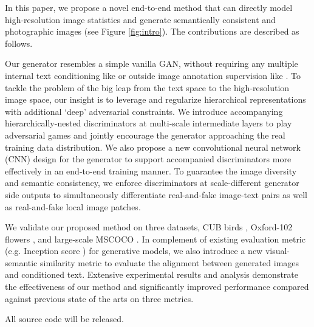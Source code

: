 \documentclass[10pt,twocolumn,letterpaper]{article}
\begin{document}
In this paper, we propose a novel end-to-end method that can directly model high-resolution image statistics and generate semantically consistent and photographic images (see Figure \ref{fig:intro}). The contributions are described as follows.

Our generator resembles a simple vanilla GAN, without requiring any multiple internal text conditioning like \cite{han2017stackgan} or outside image annotation supervision like \cite{dash2017tac}. To tackle the problem of the big leap from the text space to the high-resolution image space, our insight is to leverage and regularize hierarchical representations with additional `deep' adversarial constraints. 
We introduce accompanying hierarchically-nested discriminators at multi-scale intermediate layers to play adversarial games and jointly encourage the generator approaching the real training data distribution. 
We also propose a new convolutional neural network (CNN) design for the generator to support accompanied discriminators more effectively in an end-to-end training manner.
To guarantee the image diversity and semantic consistency,
we enforce discriminators at scale-different generator side outputs to simultaneously differentiate real-and-fake image-text pairs as well as real-and-fake
local image patches.





We validate our proposed method on three datasets, CUB birds \cite{welinder2010caltech}, Oxford-102 flowers \cite{Nilsback08}, and large-scale MSCOCO \cite{lin2014microsoft}. In complement of existing evaluation metric (e.g. Inception score \cite{improvedGAN}) for generative models, we also introduce a new visual-semantic similarity metric to evaluate the alignment between generated images and conditioned text. Extensive experimental results and analysis demonstrate the effectiveness of our method and significantly improved performance compared against previous state of the arts on three metrics. 

All source code will be released.
\end{document}
